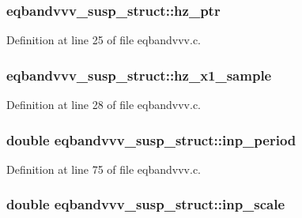 \subsubsection[{\texorpdfstring{hz\+\_\+ptr}{hz_ptr}}]{ eqbandvvv\+\_\+susp\+\_\+struct\+::hz\+\_\+ptr}\hypertarget{structeqbandvvv__susp__struct_a620b4329d9d580359dce407e633cb17d}{}\label{structeqbandvvv__susp__struct_a620b4329d9d580359dce407e633cb17d}


Definition at line 25 of file eqbandvvv.\+c.

\subsubsection[{\texorpdfstring{hz\+\_\+x1\+\_\+sample}{hz_x1_sample}}]{ eqbandvvv\+\_\+susp\+\_\+struct\+::hz\+\_\+x1\+\_\+sample}\hypertarget{structeqbandvvv__susp__struct_ab663c568545e71caec6606d9c7cbfd39}{}\label{structeqbandvvv__susp__struct_ab663c568545e71caec6606d9c7cbfd39}


Definition at line 28 of file eqbandvvv.\+c.

\subsubsection[{\texorpdfstring{inp\+\_\+period}{inp_period}}]{\setlength{\rightskip}{0pt plus 5cm}double eqbandvvv\+\_\+susp\+\_\+struct\+::inp\+\_\+period}\hypertarget{structeqbandvvv__susp__struct_a2eaacc14e589477a4c590034d7f2dbc6}{}\label{structeqbandvvv__susp__struct_a2eaacc14e589477a4c590034d7f2dbc6}


Definition at line 75 of file eqbandvvv.\+c.

\subsubsection[{\texorpdfstring{inp\+\_\+scale}{inp_scale}}]{\setlength{\rightskip}{0pt plus 5cm}double eqbandvvv\+\_\+susp\+\_\+struct\+::inp\+\_\+scale}\hypertarget{structeqbandvvv__susp__struct_a9a7b2bab723348a3be1c3524bd9fc9ff}{}\label{structeqbandvvv__susp__struct_a9a7b2bab723348a3be1c3524bd9fc9ff}


